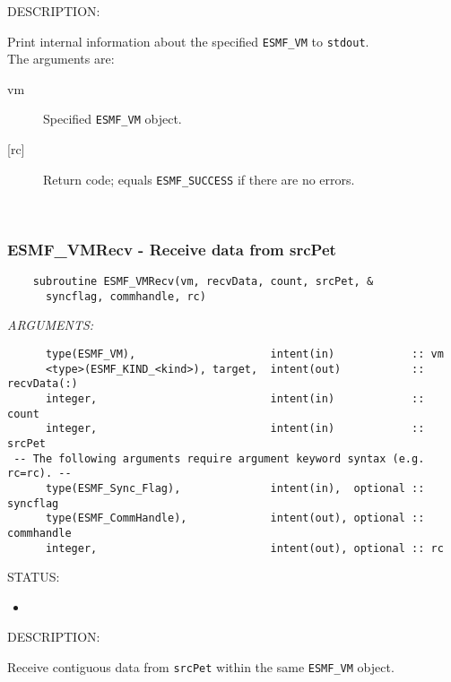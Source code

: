 {\sf DESCRIPTION:\\ }


     Print internal information about the specified {\tt ESMF\_VM} to
     {\tt stdout}.\\
  
     The arguments are:
     \begin{description}
     \item[vm] 
          Specified {\tt ESMF\_VM} object.
     \item[{[rc]}] 
          Return code; equals {\tt ESMF\_SUCCESS} if there are no errors.
     \end{description}
   
 
\mbox{}\hrulefill\ 
 
\subsubsection [ESMF\_VMRecv] {ESMF\_VMRecv - Receive data from srcPet}


  
\begin{verbatim}    subroutine ESMF_VMRecv(vm, recvData, count, srcPet, &
      syncflag, commhandle, rc)\end{verbatim}{\em ARGUMENTS:}
\begin{verbatim}      type(ESMF_VM),                     intent(in)            :: vm
      <type>(ESMF_KIND_<kind>), target,  intent(out)           :: recvData(:)  
      integer,                           intent(in)            :: count
      integer,                           intent(in)            :: srcPet
 -- The following arguments require argument keyword syntax (e.g. rc=rc). --
      type(ESMF_Sync_Flag),              intent(in),  optional :: syncflag
      type(ESMF_CommHandle),             intent(out), optional :: commhandle
      integer,                           intent(out), optional :: rc           \end{verbatim}
{\sf STATUS:}
   \begin{itemize}
   \item{}
   \end{itemize}
  
{\sf DESCRIPTION:\\ }


     Receive contiguous data from {\tt srcPet} within the same {\tt ESMF\_VM} 
     object.
  
